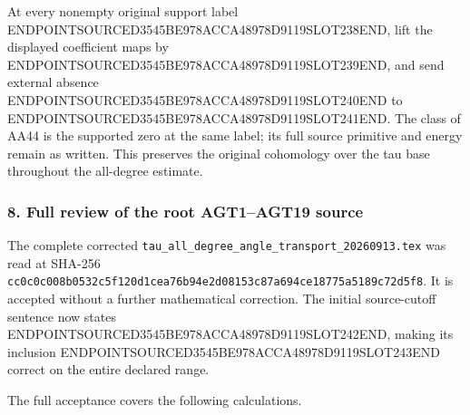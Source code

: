 At every nonempty original support label ENDPOINTSOURCED3545BE978ACCA48978D9119SLOT238END, lift the displayed coefficient maps by ENDPOINTSOURCED3545BE978ACCA48978D9119SLOT239END, and send external absence ENDPOINTSOURCED3545BE978ACCA48978D9119SLOT240END to ENDPOINTSOURCED3545BE978ACCA48978D9119SLOT241END. The class of AA44 is the supported zero at the same label; its full source primitive and energy remain as written. This preserves the original cohomology over the tau base throughout the all-degree estimate.

\subsubsection{8. Full review of the root AGT1--AGT19 source}\label{endpoint-all_degree_angle_review--full-review-of-the-root-agt1agt19-source}

The complete corrected \texttt{tau\_all\_degree\_angle\_transport\_20260913.tex} was read at SHA-256 \texttt{cc0c0c008b0532c5f120d1cea76b94e2d08153c87a694ce18775a5189c72d5f8}. It is accepted without a further mathematical correction. The initial source-cutoff sentence now states ENDPOINTSOURCED3545BE978ACCA48978D9119SLOT242END, making its inclusion ENDPOINTSOURCED3545BE978ACCA48978D9119SLOT243END correct on the entire declared range.

The full acceptance covers the following calculations.

